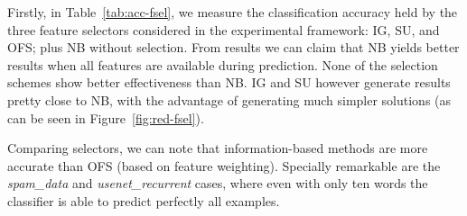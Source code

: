 \documentclass[preprint,12pt]{elsarticle}
\begin{document}
\begin{itemize}
Firstly, in Table~\ref{tab:acc-fsel}, we measure the classification accuracy held by the three feature selectors considered in the experimental framework: IG, SU, and OFS; plus NB without selection. From results we can claim that NB yields better results when all features are available during prediction. None of the selection schemes show better effectiveness than NB. IG and SU however generate results pretty close to NB, with the advantage of generating much simpler solutions (as can be seen in Figure~\ref{fig:red-fsel}). 

Comparing selectors, we can note that information-based methods are more accurate than OFS (based on feature weighting). Specially remarkable are the \textit{spam\_data} and \textit{usenet\_recurrent} cases, where even with only ten words the classifier is able to predict perfectly all examples. 



\end{itemize}
\end{document}
